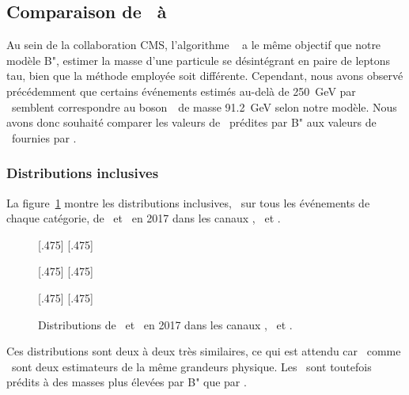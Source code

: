 \subsection{Comparaison de \mml\ à \msv}
Au sein de la collaboration CMS, l'algorithme \SVFIT~\cite{SVFit_Bianchini_2014} a le même objectif que notre modèle B",
estimer la masse d'une particule se désintégrant en paire de leptons tau,
bien que la méthode employée soit différente.
Cependant, nous avons observé précédemment que certains événements estimés au-delà de \SI{250}{\GeV} par \SVFIT\ semblent correspondre au boson~\Zboson\ de masse \SI{91.2}{\GeV} selon notre modèle.
Nous avons donc souhaité comparer
les valeurs de \mml\ prédites par B"
aux valeurs de \msv\ fournies par \SVFIT.
\subsubsection{Distributions inclusives}
La figure~\ref{fig-svfit_vs_ml_2017}
montre les distributions inclusives, \ie\ sur tous les événements de chaque catégorie, de \msv\ et \mml\ en 2017 dans les canaux \tauh\tauh, \ele\tauh\ et \ele\mu.
\begin{figure}[p]
\centering

[.475\textwidth]
{}
\hfill
{}[.475\textwidth]
{}

[.475\textwidth]
{}
\hfill
{}[.475\textwidth]
{}

[.475\textwidth]
{}
\hfill
{}[.475\textwidth]
{}

\caption{Distributions de \msv\ et \mml\ en 2017 dans les canaux \tauh\tauh, \ele\tauh\ et \ele\mu.}
\label{fig-svfit_vs_ml_2017}
\end{figure}
Ces distributions sont deux à deux très similaires,
ce qui est attendu car \msv\ comme \mml\ sont deux estimateurs de la même grandeurs physique.
Les \ftauhs\ sont toutefois prédits à des masses plus élevées par B" que par \SVFIT.
